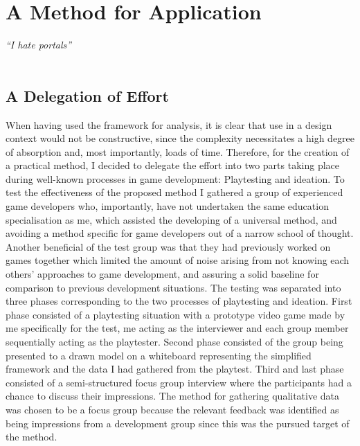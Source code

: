 \chapter{A Method for Application}
\textit{``I hate portals''} \\
 \\

\section{A Delegation of Effort}
When having used the framework for analysis, it is clear that use in a design context would not be constructive, since the complexity necessitates a high degree of absorption and, most importantly, loads of time. Therefore, for the creation of a practical method, I decided to delegate the effort into two parts taking place during well-known processes in game development: Playtesting and ideation. To test the effectiveness of the proposed method I gathered a group of experienced game developers who, importantly, have not undertaken the same education specialisation as me, which assisted the developing of a universal method, and avoiding a method specific for game developers out of a narrow school of thought. Another beneficial of the test group was that they had previously worked on games together which limited the amount of noise arising from not knowing each others' approaches to game development, and assuring a solid baseline for comparison to previous development situations. The testing was separated into three phases corresponding to the two processes of playtesting and ideation. First phase consisted of a playtesting situation with a prototype video game made by me specifically for the test, me acting as the interviewer and each group member sequentially acting as the playtester. Second phase consisted of the group being presented to a drawn model on a whiteboard representing the simplified framework and the data I had gathered from the playtest. Third and last phase consisted of a semi-structured focus group interview \cite{cresswell} where the participants had a chance to discuss their impressions. The method for gathering qualitative data was chosen to be a focus group because the relevant feedback was identified as being impressions from a development group since this was the pursued target of the method.

